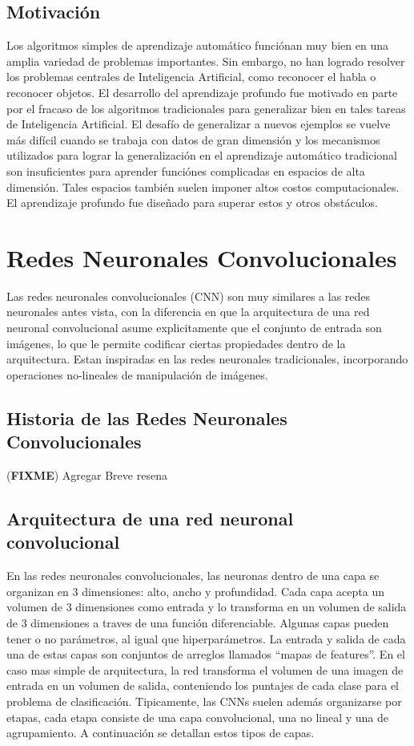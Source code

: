 \documentclass[a4paper,11pt,spanish]{book}
\newcommand*{\FIXME}[1]{{(\textbf{FIXME}) {#1}}}
\begin{document}
    \subsection {Motivación}
      Los algoritmos simples de aprendizaje automático funciónan muy bien en una amplia variedad de problemas importantes. 
      Sin embargo, no han logrado resolver los problemas centrales de Inteligencia Artificial, como reconocer el habla o reconocer objetos. 
      El desarrollo del aprendizaje profundo fue motivado en parte por el fracaso de los algoritmos tradicionales para generalizar bien en tales tareas de Inteligencia Artificial.
      El desafío de generalizar a nuevos ejemplos se vuelve más difícil cuando se trabaja con datos de gran dimensión y los mecanismos utilizados para lograr la generalización 
      en el aprendizaje  automático tradicional son insuficientes para aprender funciónes complicadas en espacios de alta dimensión. 
      Tales espacios también suelen imponer altos costos computacionales. El aprendizaje profundo fue diseñado para superar estos y otros obstáculos.

  \section {Redes Neuronales Convolucionales}
    Las redes neuronales convolucionales (CNN) son muy similares a las redes neuronales antes vista, con la diferencia en que la arquitectura de una red neuronal convolucional asume explicitamente
    que el conjunto de entrada son imágenes, lo que le permite codificar ciertas propiedades dentro de la arquitectura. 
    Estan inspiradas en las redes neuronales tradicionales, incorporando operaciones no-lineales de manipulación de imágenes.

    \subsection {Historia de las Redes Neuronales Convolucionales}
      \FIXME{Agregar Breve resena}

    \subsection {Arquitectura de una red neuronal convolucional}
      En las redes neuronales convolucionales, las neuronas dentro de una capa se organizan en 3 dimensiones: alto, ancho y profundidad.
      Cada capa acepta un volumen de 3 dimensiones como entrada y lo transforma en un volumen de salida de 3 dimensiones a traves de una función diferenciable.
      Algunas capas pueden tener o no parámetros, al igual que hiperparámetros. La entrada y salida de cada una de estas capas son conjuntos de arreglos llamados “mapas de features”.
      En el caso mas simple de arquitectura, la red transforma el volumen de una imagen de entrada en un volumen de salida, conteniendo los puntajes de cada clase para el problema de clasificación.
      Tipicamente, las CNNs suelen además organizarse por etapas, cada etapa consiste de una capa convolucional, una no lineal y una de agrupamiento. 
      A continuación se detallan estos tipos de capas.
\end{document}
